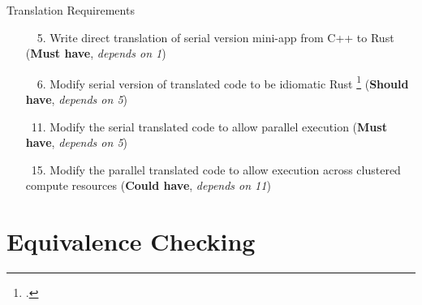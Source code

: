 \documentclass[10pt,aspectratio=169]{beamer}
\newcommand{\cmark}{\ding{51}}
\newcommand{\done}{\rlap{$\square$}{\raisebox{2pt}{\large\hspace{1pt}\textcolor{green}{\cmark}}}\hspace{-2.5pt}}
\begin{document}
\begin{frame}{Translation Requirements}
    \begin{itemize}
        \item[\done\ \ 5.]
          Write direct translation of serial version mini-app from C++ to Rust
          (\textbf{Must have}, \textit{depends on 1})
        \item[\done\ \ 6.]
          Modify serial version of translated code to be idiomatic Rust \footcite{endlerMreIdiomaticrust2023} 
          (\textbf{Should have}, \textit{depends on 5})
        \item[\done\ 11.]
          Modify the serial translated code to allow parallel execution
          (\textbf{Must have}, \textit{depends on 5})
        \item[\done\ 15.]
          Modify the parallel translated code to allow execution across clustered compute resources
          (\textbf{Could have}, \textit{depends on 11})
    \end{itemize}
\end{frame}




\section{Equivalence Checking}
\end{document}
